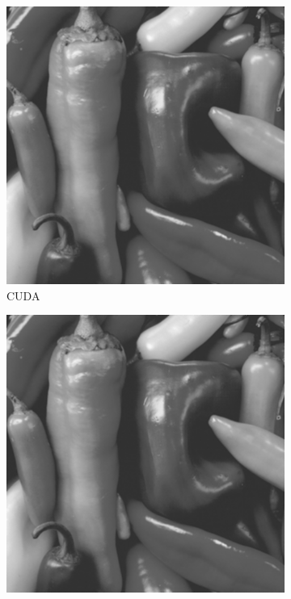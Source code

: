 \begin{markdown}
\begin{figure}[H]
\begin{subfigure}{.49\textwidth}
    \includegraphics[width=1\textwidth]{body/figures/results/blur/cuda.png}
    \caption{CUDA}
    \label{fig:res:blur:pic:cuda}
  \end{subfigure}%
  \hspace{.01\textwidth}
  \begin{subfigure}{.49\textwidth}
    \centering
    \includegraphics[width=1\textwidth]{body/figures/results/blur/julia.png}

\end{subfigure}
\end{figure}
\end{markdown}
